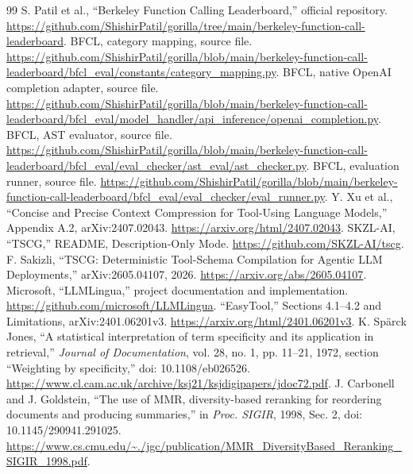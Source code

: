 \documentclass[conference]{IEEEtran}
\begin{document}
\begin{thebibliography}{99}
 S. Patil et al., ``Berkeley Function Calling Leaderboard,'' official repository. \url{https://github.com/ShishirPatil/gorilla/tree/main/berkeley-function-call-leaderboard}.
 BFCL, category mapping, source file. \url{https://github.com/ShishirPatil/gorilla/blob/main/berkeley-function-call-leaderboard/bfcl_eval/constants/category_mapping.py}.
 BFCL, native OpenAI completion adapter, source file. \url{https://github.com/ShishirPatil/gorilla/blob/main/berkeley-function-call-leaderboard/bfcl_eval/model_handler/api_inference/openai_completion.py}.
 BFCL, AST evaluator, source file. \url{https://github.com/ShishirPatil/gorilla/blob/main/berkeley-function-call-leaderboard/bfcl_eval/eval_checker/ast_eval/ast_checker.py}.
 BFCL, evaluation runner, source file. \url{https://github.com/ShishirPatil/gorilla/blob/main/berkeley-function-call-leaderboard/bfcl_eval/eval_checker/eval_runner.py}.
 Y. Xu et al., ``Concise and Precise Context Compression for Tool-Using Language Models,'' Appendix A.2, arXiv:2407.02043. \url{https://arxiv.org/html/2407.02043}.
 SKZL-AI, ``TSCG,'' README, Description-Only Mode. \url{https://github.com/SKZL-AI/tscg}.
 F. Sakizli, ``TSCG: Deterministic Tool-Schema Compilation for Agentic LLM Deployments,'' arXiv:2605.04107, 2026. \url{https://arxiv.org/abs/2605.04107}.
 Microsoft, ``LLMLingua,'' project documentation and implementation. \url{https://github.com/microsoft/LLMLingua}.
 ``EasyTool,'' Sections 4.1--4.2 and Limitations, arXiv:2401.06201v3. \url{https://arxiv.org/html/2401.06201v3}.
 K. Sp\"{a}rck Jones, ``A statistical interpretation of term specificity and its application in retrieval,'' \emph{Journal of Documentation}, vol. 28, no. 1, pp. 11--21, 1972, section ``Weighting by specificity,'' doi: 10.1108/eb026526. \url{https://www.cl.cam.ac.uk/archive/ksj21/ksjdigipapers/jdoc72.pdf}.
 J. Carbonell and J. Goldstein, ``The use of MMR, diversity-based reranking for reordering documents and producing summaries,'' in \emph{Proc. SIGIR}, 1998, Sec. 2, doi: 10.1145/290941.291025. \url{https://www.cs.cmu.edu/~./jgc/publication/MMR_DiversityBased_Reranking_SIGIR_1998.pdf}.
\end{thebibliography}
\end{document}
